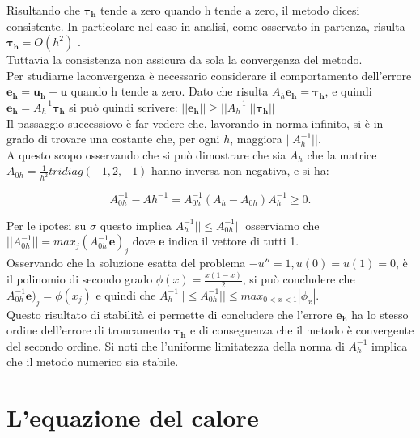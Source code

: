 \vspace{1em}

Risultando che $\boldsymbol{\tau_h}$ tende a zero quando h tende a zero, il metodo dicesi consistente. In particolare nel caso in analisi, come osservato in partenza, risulta $\boldsymbol{\tau_h} = O(h^2)$ .\\
Tuttavia la consistenza non assicura da sola la convergenza del metodo.\\
Per studiarne laconvergenza è necessario considerare il comportamento dell’errore $\boldsymbol{e_h} = \boldsymbol{u_h} -\boldsymbol{u}$ quando h tende a zero. Dato che risulta $A_h\boldsymbol{e_h} = \boldsymbol{\tau_h}$, e quindi $\boldsymbol{e_h} = A_h^{-1} \boldsymbol{\tau_h}$ si può quindi scrivere: $||\boldsymbol{e_h}||\geq ||A_h^{-1}|| |\boldsymbol{\tau_h}||$\\
Il passaggio successiovo è far vedere che, lavorando in norma infinito, si è in grado di trovare una costante che, per ogni $h$, maggiora $||A_h^{-1}||$. \\ 
\newpage
A questo scopo osservando che si può dimostrare che sia $A_h$ che la matrice $A_{0h} = \frac{1}{h^2} tridiag(-1,2,-1)$ hanno inversa non negativa, e si ha: 

$$A_{0h}^{-1}-A{h}^{-1}=A_{0h}^{-1}(A_h-A_{0h})A_h^{-1}\geq0.$$

Per le ipotesi su $\sigma$ questo implica $A_h^{-1}||\leq A_{0h}^{-1}||$
osserviamo che
$||A_{0h}^{-1}||=max_j(A_{0h}^{-1}\boldsymbol{e})_j$ dove $\boldsymbol{e}$ indica il vettore di tutti 1.\\
Osservando che la soluzione esatta del problema $-u'' = 1, u(0) = u(1) = 0$, è il polinomio di secondo grado $\phi(x) = \frac{x(1-x)}{2}$, si può concludere che $A_{0h}^{-1}\boldsymbol{e})_j=\phi(x_j)$ e quindi che $A_h^{-1}||\leq A_{0h}^{-1}||\leq max_{0<x<1}|\phi_x|$.\\
Questo risultato di stabilità ci permette di concludere che l’errore $\boldsymbol{e_h}$ ha lo stesso ordine dell’errore di troncamento $\boldsymbol{\tau_h}$ e di conseguenza che il metodo è convergente del secondo ordine.
Si noti che l’uniforme limitatezza della norma di $A_h^{-1}$ implica che il metodo numerico sia stabile. 




\newpage

\section{L'equazione del calore}

